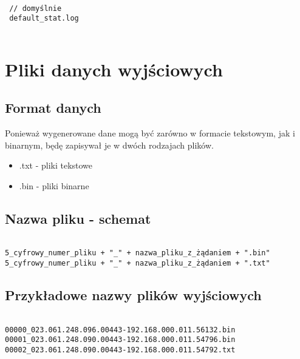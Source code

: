 \documentclass[a4paper,11pt]{report}
\begin{document}
\begin{lstlisting}  

 // domyślnie
 default_stat.log
 
\end{lstlisting}

\section{Pliki danych wyjściowych}

\subsection{Format danych}

Ponieważ wygenerowane dane mogą być zarówno w formacie tekstowym, jak i binarnym, będę zapisywał je w dwóch rodzajach plików.

\begin{itemize}

\item .txt - pliki tekstowe
\item .bin - pliki binarne 

\end{itemize}

\subsection{Nazwa pliku - schemat}

\begin{lstlisting}

5_cyfrowy_numer_pliku + "_" + nazwa_pliku_z_żądaniem + ".bin"
5_cyfrowy_numer_pliku + "_" + nazwa_pliku_z_żądaniem + ".txt"

\end{lstlisting}

\subsection{Przykładowe nazwy plików wyjściowych}

\begin{lstlisting}

00000_023.061.248.096.00443-192.168.000.011.56132.bin
00001_023.061.248.090.00443-192.168.000.011.54796.bin
00002_023.061.248.090.00443-192.168.000.011.54792.txt

\end{lstlisting}
\end{document}
